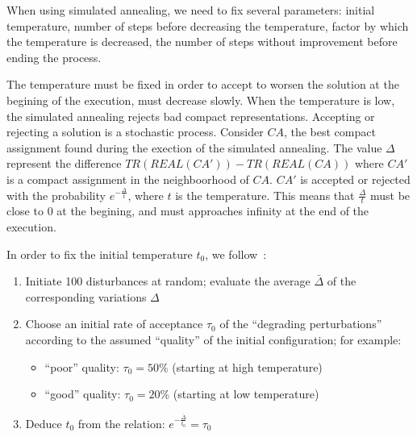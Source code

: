  When using simulated annealing, we need to fix several parameters: initial temperature, number of steps before decreasing the temperature, factor by which the temperature is decreased, the number of steps without improvement before ending the process.


 The temperature must be fixed in order to accept to worsen the solution at the begining of the execution, must decrease slowly. When the temperature is low, the simulated annealing rejects bad compact representations.
 Accepting or rejecting a solution is a stochastic process. Consider $CA$, the best compact assignment found during the exection of the simulated annealing. The value $\Delta$ represent the difference $TR(REAL(CA'))-TR(REAL(CA))$ where $CA'$ is a compact assignment in the neighboorhood of $CA$. $CA'$ is accepted or rejected with the probability $e^{-\frac{\Delta}{t}} $, where $t$ is the temperature.
 This means that $\frac{\Delta}{t}$ must be close to $0$ at the begining, and must approaches infinity at the end of the execution. 
 
 In order to fix the initial temperature $t_0$, we follow~\cite{osman1997meta}:
 \begin{enumerate}
  \item Initiate 100 disturbances at random; evaluate the average $\bar{\Delta}$ of the corresponding variations $\Delta$
\item Choose an initial rate of acceptance $\tau_0$ of the “degrading perturbations” according to the assumed “quality” of the initial configuration; for example:
\begin{itemize}
 \item “poor” quality: $\tau_0 = 50 \%$ (starting at high temperature)
\item “good” quality: $\tau_0 = 20 \%$ (starting at low temperature)
\end{itemize}


\item Deduce $t_0$ from the relation: $e^{-\frac{\bar{\Delta}}{t_0}} = \tau_0$ 
 \end{enumerate}
 
